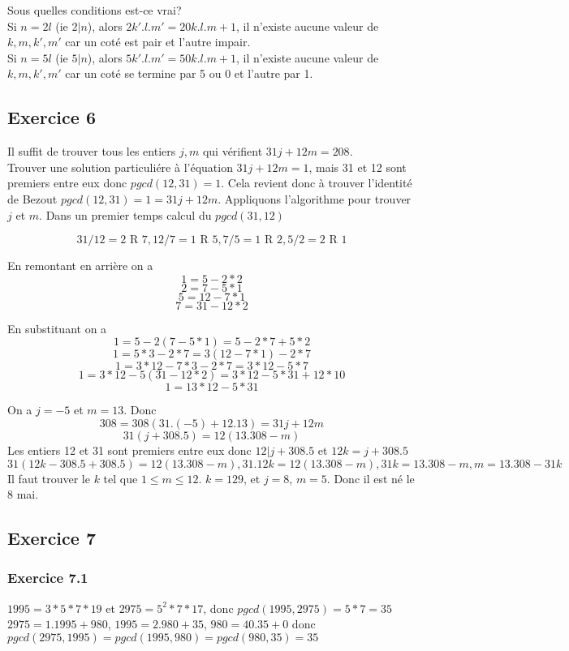 \documentclass[]{book}
\theoremstyle{definition}
\begin{document}
Sous quelles conditions est-ce vrai?\\
Si $n=2l$ (ie $2|n$), alors $2k'.l.m' = 20k.l.m+1$, il n'existe aucune valeur de $k,m,k',m'$ car un cot\'e est pair et l'autre impair.\\
Si $n=5l$ (ie $5|n$), alors $5k'.l.m' = 50k.l.m+1$, il n'existe aucune valeur de $k,m,k',m'$ car un cot\'e se termine par 5 ou 0 et l'autre par 1.\\


\subsection*{Exercice 6}
Il suffit de trouver tous les entiers $j,m$ qui v\'erifient $31j+12m=208$.\\
Trouver une solution particuli\'ere \`a l'\'equation $31j+12m=1$, mais 31 et 12 sont premiers entre eux donc $pgcd(12,31)=1$. Cela revient donc \`a trouver l'identit\'e de Bezout $pgcd(12,31) = 1 = 31j+12m$. Appliquons l'algorithme pour trouver $j$ et $m$. Dans un premier temps calcul du $pgcd(31,12)$

$$31/12=2\text{ R }7, 12/7=1\text{ R }5, 7/5=1\text{ R }2, 5/2=2\text{ R }1$$

En remontant en arri\`ere on a
$$1 = 5 - 2*2$$
$$2 = 7-5*1$$
$$5 = 12 - 7*1$$
$$7=31-12*2$$

En substituant on a
$$1 = 5 - 2(7-5*1) = 5 - 2*7 + 5*2$$
$$1 = 5*3 -2*7 = 3(12-7*1) - 2*7 $$
$$1= 3*12 - 7*3 - 2*7 = 3*12 - 5*7 $$
$$1= 3*12 - 5(31-12*2) = 3*12 - 5*31 +12*10$$
$$1 = 13*12 - 5*31$$

On a $j=-5$ et $m=13$. Donc 
$$308 = 308(31.(-5) + 12.13) =  31j + 12m$$
$$31(j+308.5) = 12(13.308-m)$$
Les entiers 12 et 31 sont premiers entre eux donc $12|j+308.5$ et $12k=j+308.5$
$$31(12k-308.5+308.5) = 12(13.308-m), 31.12k=12(13.308-m), 31k = 13.308-m, m=13.308-31k$$
Il faut trouver le $k$ tel que $1\leq m\leq 12$. $k=129$, et $j=8$, $m=5$. Donc il est n\'e le 8 mai.


\subsection*{Exercice 7}
\subsubsection*{Exercice 7.1}
$1995 = 3*5*7*19$ et $2975 = 5^2*7*17$, donc $pgcd(1995,2975) = 5*7 = 35$\\

$2975=1.1995+980$, $1995 = 2.980+35$, $980 = 40.35+0$ donc $pgcd(2975,1995)=pgcd(1995,980)=pgcd(980,35)=35$
\end{document}
